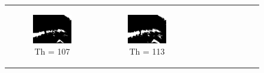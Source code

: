 \begin{figure}[htbp]
\begin{tabular}{cccc}
\begin{subfigure}{0.2\linewidth}
    \includegraphics[width=\linewidth]{plots/thresholding/th8}
    \caption{Th = 107}
    \end{subfigure} &
    \begin{subfigure}{0.2\linewidth}
    \centering
    \includegraphics[width=\linewidth]{plots/thresholding/th9}
    \caption{Th = 113}
    \end{subfigure} &
    \begin{subfigure}{0.2\linewidth}
    \centering

\end{subfigure}
\end{tabular}
\end{figure}
